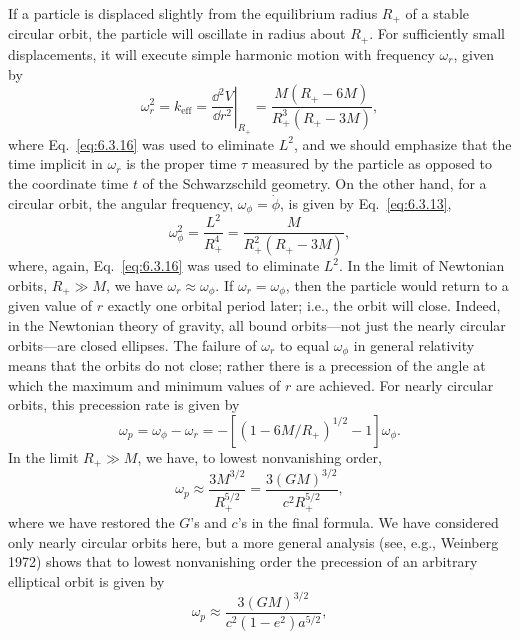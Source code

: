 If a particle is displaced slightly from the equilibrium radius \(R_+\) of a
stable circular orbit, the particle will oscillate in radius about \(R_+\). For
sufficiently small displacements, it will execute simple harmonic motion with
frequency \(\omega_r\), given by
\begin{equation}
  \omega_r^2=k_{\mathrm{eff}}
  =\left.\frac{\dd^2V}{\dd r^2}\right|_{R_+}
  =\frac{M(R_+-6M)}{R_+^3(R_+-3M)},
  \tag{6.3.24}\label{eq:6.3.24}
\end{equation}
where Eq.~\eqref{eq:6.3.16} was used to eliminate \(L^2\), and we should
emphasize that the time implicit in \(\omega_r\) is the proper time \(\tau\)
measured by the particle as opposed to the coordinate time \(t\) of the
Schwarzschild geometry. On the other hand, for a circular orbit, the angular
frequency, \(\omega_\phi=\dot\phi\), is given by Eq.~\eqref{eq:6.3.13},
\begin{equation}
  \omega_\phi^2=\frac{L^2}{R_+^4}=\frac{M}{R_+^2(R_+-3M)},
  \tag{6.3.25}\label{eq:6.3.25}
\end{equation}
where, again, Eq.~\eqref{eq:6.3.16} was used to eliminate \(L^2\). In the limit
of Newtonian orbits, \(R_+\gg M\), we have \(\omega_r\approx\omega_\phi\). If
\(\omega_r=\omega_\phi\), then the particle would return to a given value of \(r\)
exactly one orbital period later; i.e., the orbit will close. Indeed, in the
Newtonian theory of gravity, all bound orbits---not just the nearly circular
orbits---are closed ellipses. The failure of \(\omega_r\) to equal
\(\omega_\phi\) in general relativity means that the orbits do not close; rather
there is a precession of the angle at which the maximum and minimum values of
\(r\) are achieved. For nearly circular orbits, this precession rate is given by
\begin{equation}
  \omega_p=\omega_\phi-\omega_r
  =-\left[(1-6M/R_+)^{1/2}-1\right]\omega_\phi.
  \tag{6.3.26}\label{eq:6.3.26}
\end{equation}
In the limit \(R_+\gg M\), we have, to lowest nonvanishing order,
\begin{equation}
  \omega_p\approx\frac{3M^{3/2}}{R_+^{5/2}}
  =\frac{3(GM)^{3/2}}{c^2R_+^{5/2}},
  \tag{6.3.27}\label{eq:6.3.27}
\end{equation}
where we have restored the \(G\)'s and \(c\)'s in the final formula. We have
considered only nearly circular orbits here, but a more general analysis (see,
e.g., Weinberg 1972) shows that to lowest nonvanishing order the precession of an
arbitrary elliptical orbit is given by
\begin{equation}
  \omega_p\approx\frac{3(GM)^{3/2}}{c^2(1-e^2)a^{5/2}},
  \tag{6.3.28}\label{eq:6.3.28}
\end{equation}
